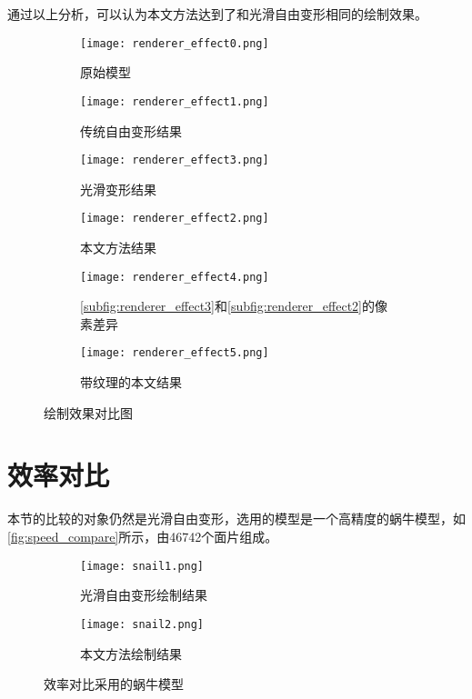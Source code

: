 通过以上分析，可以认为本文方法达到了和光滑自由变形相同的绘制效果。
\begin{figure}[htbp]
	\centering
	\begin{subfigure}[b]{.4\textwidth}
		\centering
		\texttt{[image: renderer\_effect0.png]}
		\caption{原始模型}\label{subfig:renderer_effect0}
	\end{subfigure}
	\quad
	\begin{subfigure}[b]{.4\textwidth}
		\centering
		\texttt{[image: renderer\_effect1.png]}
		\caption{传统自由变形结果}\label{subfig:renderer_effect1}
	\end{subfigure}

	\centering
	\begin{subfigure}[b]{.4\textwidth}
		\centering
		\texttt{[image: renderer\_effect3.png]}
		\caption{光滑变形结果}\label{subfig:renderer_effect3}
	\end{subfigure}
	\quad
	\begin{subfigure}[b]{.4\textwidth}
		\centering
		\texttt{[image: renderer\_effect2.png]}
		\caption{本文方法结果}\label{subfig:renderer_effect2}
	\end{subfigure}

	\centering
	\begin{subfigure}[b]{.4\textwidth}
		\centering
		\texttt{[image: renderer\_effect4.png]}
        \caption{\autoref{subfig:renderer_effect3}和\autoref{subfig:renderer_effect2}的像素差异}\label{subfig:renderer_effect4}
	\end{subfigure}
	\quad
	\begin{subfigure}[b]{.4\textwidth}
		\centering
		\texttt{[image: renderer\_effect5.png]}
		\caption{带纹理的本文结果}\label{subfig:renderer_effect5}
	\end{subfigure}
	\caption{绘制效果对比图}\label{subfig:renderer_effect}
\end{figure}

\section{效率对比}
本节的比较的对象仍然是光滑自由变形，选用的模型是一个高精度的蜗牛模型，如\autoref{fig:speed_compare}所示，由46742个面片组成。

\begin{figure}[htbp]
	\centering
	\begin{subfigure}[b]{.4\textwidth}
		\centering
		\texttt{[image: snail1.png]}
		\caption{光滑自由变形绘制结果}\label{subfig:snail1}
	\end{subfigure}
	\quad
	\begin{subfigure}[b]{.4\textwidth}
		\centering
		\texttt{[image: snail2.png]}
		\caption{本文方法绘制结果}\label{subfig:snail2}
	\end{subfigure}
	\caption{效率对比采用的蜗牛模型}\label{fig:speed_compare}
\end{figure}

